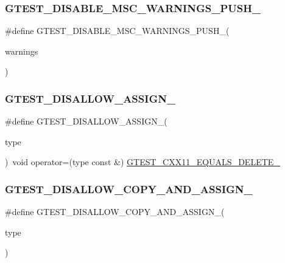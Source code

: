 \subsubsection{\texorpdfstring{GTEST\_DISABLE\_MSC\_WARNINGS\_PUSH\_}{GTEST\_DISABLE\_MSC\_WARNINGS\_PUSH\_}}
{\footnotesize\ttfamily \#define G\+T\+E\+S\+T\+\_\+\+D\+I\+S\+A\+B\+L\+E\+\_\+\+M\+S\+C\+\_\+\+W\+A\+R\+N\+I\+N\+G\+S\+\_\+\+P\+U\+S\+H\+\_\+(\begin{DoxyParamCaption}\item[{}]{warnings }\end{DoxyParamCaption})}

\mbox{\label{_obj__test_2lib_2googletest-release-1_88_81_2googletest_2include_2gtest_2internal_2gtest-port_8h_ac593b50ce24257d5b6aa84845c344c9e}} 
\subsubsection{\texorpdfstring{GTEST\_DISALLOW\_ASSIGN\_}{GTEST\_DISALLOW\_ASSIGN\_}}
{\footnotesize\ttfamily \#define G\+T\+E\+S\+T\+\_\+\+D\+I\+S\+A\+L\+L\+O\+W\+\_\+\+A\+S\+S\+I\+G\+N\+\_\+(\begin{DoxyParamCaption}\item[{}]{type }\end{DoxyParamCaption})~void operator=(type const \&) \mbox{\hyperlink{_obj__test_2lib_2googletest-release-1_88_81_2googletest_2include_2gtest_2internal_2gtest-port_8h_ab229f1a8ec704ba6a97918f9239547c4}{G\+T\+E\+S\+T\+\_\+\+C\+X\+X11\+\_\+\+E\+Q\+U\+A\+L\+S\+\_\+\+D\+E\+L\+E\+T\+E\+\_\+}}}

\mbox{\label{_obj__test_2lib_2googletest-release-1_88_81_2googletest_2include_2gtest_2internal_2gtest-port_8h_aed8c1888c32b588b0681e88b95031e29}} 
\subsubsection{\texorpdfstring{GTEST\_DISALLOW\_COPY\_AND\_ASSIGN\_}{GTEST\_DISALLOW\_COPY\_AND\_ASSIGN\_}}
{\footnotesize\ttfamily \#define G\+T\+E\+S\+T\+\_\+\+D\+I\+S\+A\+L\+L\+O\+W\+\_\+\+C\+O\+P\+Y\+\_\+\+A\+N\+D\+\_\+\+A\+S\+S\+I\+G\+N\+\_\+(\begin{DoxyParamCaption}\item[{}]{type }\end{DoxyParamCaption})}

